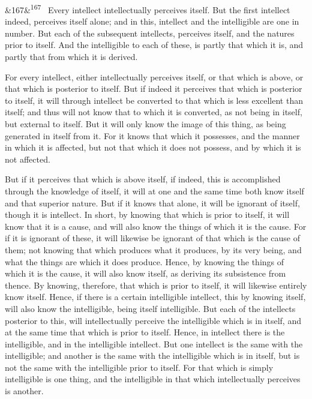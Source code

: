 \documentclass[12pt]{article}
\newcommand{\para}[1][]{\par\noindent\ifx&#1&\else\textsuperscript{\footnotesize #1}~\fi}
\begin{document}
\para[167] Every intellect intellectually perceives itself. But the first intellect indeed, perceives itself alone; and in this, intellect and the intelligible are one in number. But each of the subsequent intellects, perceives itself, and the natures prior to itself. And the intelligible to each of these, is partly that which it is, and partly that from which it is derived.

For every intellect, either intellectually perceives itself, or that which is above, or that which is posterior to itself. But if indeed it perceives that which is posterior to itself, it will through intellect be converted to that which is less excellent than itself; and thus will not know that to which it is converted, as not being in itself, but external to itself. But it will only know the image of this thing, as being generated in itself from it. For it knows that which it possesses, and the manner in which it is affected, but not that which it does not possess, and by which it is not affected.

But if it perceives that which is above itself, if indeed, this is accomplished through the knowledge of itself, it will at one and the same time both know itself and that superior nature. But if it knows that alone, it will be ignorant of itself, though it is intellect. In short, by knowing that which is prior to itself, it will know that it is a cause, and will also know the things of which it is the cause. For if it is ignorant of these, it will likewise be ignorant of that which is the cause of them; not knowing that which produces what it produces, by its very being, and what the things are which it does produce. Hence, by knowing the things of which it is the cause, it will also know itself, as deriving its subsistence from thence. By knowing, therefore, that which is prior to itself, it will likewise entirely know itself. Hence, if there is a certain intelligible intellect, this by knowing itself, will also know the intelligible, being itself intelligible. But each of the intellects posterior to this, will intellectually perceive the intelligible which is in itself, and at the same time that which is prior to itself. Hence, in intellect there is the intelligible, and in the intelligible intellect. But one intellect is the same with the intelligible; and another is the same with the intelligible which is in itself, but is not the same with the intelligible prior to itself. For that which is simply intelligible is one thing, and the intelligible in that which intellectually perceives is another.
\end{document}
